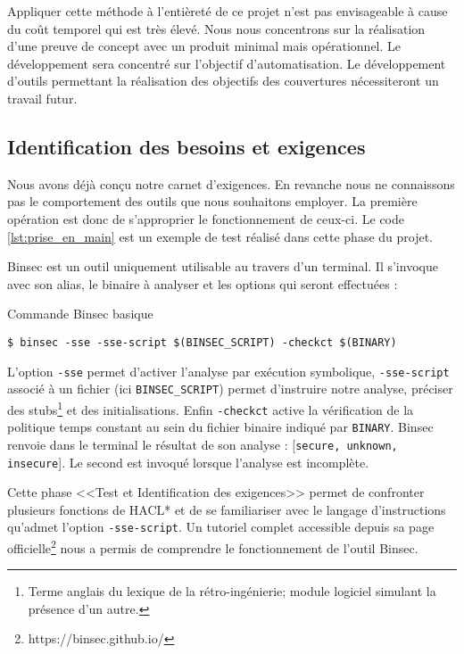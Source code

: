 Appliquer cette méthode à l'entièreté de ce projet n'est pas envisageable à cause du coût temporel qui est très élevé. Nous nous concentrons sur la réalisation d'une preuve de concept avec un produit minimal mais opérationnel. Le développement sera concentré sur l'objectif d'automatisation. Le développement d'outils permettant la réalisation des objectifs des couvertures  nécessiteront un travail futur.

\subsection*{Identification des besoins et exigences}

Nous avons déjà conçu notre carnet d'exigences. En revanche nous ne connaissons pas le comportement des outils que nous souhaitons employer. La première opération est donc de s'approprier le fonctionnement de ceux-ci. Le code \ref{lst:prise_en_main} est un exemple de test réalisé dans cette phase du projet.

Binsec est un outil uniquement utilisable au travers d'un terminal. Il s'invoque avec son alias, le binaire à analyser et les options qui seront effectuées :

\begin{listing}[!ht]
    \caption{Commande Binsec basique}
    \label{lst:commande_binsec}
    \begin{verbatim}
$ binsec -sse -sse-script $(BINSEC_SCRIPT) -checkct $(BINARY)
    \end{verbatim}
\end{listing}

L'option \texttt{-sse} permet d'activer l'analyse par exécution symbolique, \texttt{-sse-script} associé à un fichier (ici \texttt{BINSEC\_SCRIPT}) permet d'instruire notre analyse, préciser des stubs\footnote{Terme anglais du lexique de la rétro-ingénierie; module logiciel simulant la présence d'un autre.} et des initialisations. Enfin \texttt{-checkct} active la vérification de la politique temps constant au sein du fichier binaire indiqué par \texttt{BINARY}. Binsec renvoie dans le terminal le résultat de son analyse : [\texttt{secure, unknown, insecure}]. Le second est invoqué lorsque l'analyse est incomplète.\medbreak

Cette phase <<Test et Identification des exigences>> permet de confronter plusieurs fonctions de HACL* et de se familiariser avec le langage d'instructions qu'admet l'option \texttt{-sse-script}. Un tutoriel complet accessible depuis sa page officielle\footnote{https://binsec.github.io/} nous a permis de comprendre le fonctionnement de l'outil Binsec.


